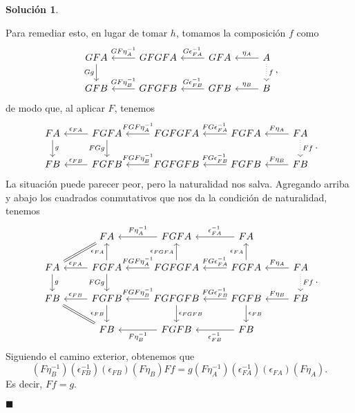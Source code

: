\documentclass[12pt,letterpaper,titlepage]{article}
\newcommand{\xqed}[1]{%
  \leavevmode\unskip\penalty9999 \hbox{}\nobreak\hfill
  \quad\hbox{\ensuremath{#1}}}
\theoremstyle{definition}
\newtheorem*{soltemp}{Solución}
\newenvironment{sol}[1]{%
    \begin{soltemp}#1}{%
    \xqed{\blacksquare}\end{soltemp}%
}
\newcommand\<{\langle}
\renewcommand\>{\rangle}
\begin{document}
\begin{sol}
\begin{itemize}
        Para remediar esto, en lugar de tomar $h$, tomamos la composición
        $f$ como
        \[
        \begin{tikzcd}
            GFA \ar[d,"Gg"']
            & GFGFA \ar[l,"GF\eta_A^{-1}"']
            & GFA \ar[l,"G\epsilon_{FA}^{-1}"']
            & A \ar[l,"\eta_A"']
            \ar[d,"f",dotted]\\
            GFB
            & GFGFB \ar[l,"GF\eta_B^{-1}"']
            & GFB \ar[l,"G\epsilon_{FB}^{-1}"']
            & B \ar[l,"\eta_B"']
        \end{tikzcd}
        ,\]
        de modo que, al aplicar $F$, tenemos
        \[
        \begin{tikzcd}
            FA \ar[d,"g"]
            & FGFA \ar[d,"FGg"'] \ar[l,"\epsilon_{FA}"']
            & FGFGFA \ar[l,"FGF\eta_A^{-1}"']
            & FGFA \ar[l,"FG\epsilon_{FA}^{-1}"']
            & FA \ar[l,"F\eta_A"']
            \ar[d,"Ff",dotted]\\
            FB
            & FGFB \ar[l,"\epsilon_{FB}"']
            & FGFGFB \ar[l,"FGF\eta_B^{-1}"']
            & FGFB \ar[l,"FG\epsilon_{FB}^{-1}"']
            & FB \ar[l,"F\eta_B"']
        \end{tikzcd}
        .\]
        La situación puede parecer peor, pero la naturalidad nos salva.
        Agregando arriba y abajo los cuadrados conmutativos que nos
        da la condición de naturalidad, tenemos
        \[
        \begin{tikzcd}
            & FA \ar[equal,dl]
            & FGFA \ar[l,"F\eta_A^{-1}"']
            & FA \ar[l,"\epsilon_{FA}^{-1}"']
            \\
            FA \ar[d,"g"]
            & FGFA \ar[d,"FGg"'] \ar[u,"\epsilon_{FA}"]\ar[l,"\epsilon_{FA}"']
            & FGFGFA \ar[l,"FGF\eta_A^{-1}"'] \ar[u,"\epsilon_{FGFA}"]
            & FGFA \ar[l,"FG\epsilon_{FA}^{-1}"'] \ar[u,"\epsilon_{FA}"]
            & FA \ar[l,"F\eta_A"']
            \ar[d,"Ff",dotted]
            \\
            FB
            & FGFB \ar[l,"\epsilon_{FB}"']\ar[d,"\epsilon_{FB}"']
            & FGFGFB \ar[l,"FGF\eta_B^{-1}"'] \ar[d,"\epsilon_{FGFB}"]
            & FGFB \ar[l,"FG\epsilon_{FB}^{-1}"'] \ar[d,"\epsilon_{FB}"]
            & FB \ar[l,"F\eta_B"']
            \\
            & FB \ar[equal,ul]
            & FGFB \ar[l,"F\eta_B^{-1}"]
            & FB \ar[l,"\epsilon_{FB}^{-1}"]
        \end{tikzcd}
        .\]
        Siguiendo el camino exterior, obtenemos que
        \[
            (F\eta_B^{-1})(\epsilon_{FB}^{-1})(\epsilon_{FB})(F\eta_B)Ff
            = g(F\eta_A^{-1})(\epsilon_{FA}^{-1})(\epsilon_{FA})(F\eta_A)
        .\]
        Es decir, $Ff=g$.
        

\end{itemize}
\end{sol}
\end{document}
